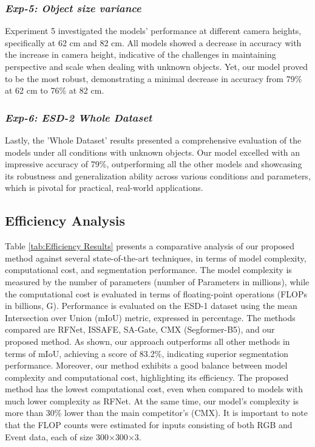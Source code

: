 \documentclass[lettersize,journal]{IEEEtran}
\begin{document}
\subsubsection{\textbf{\textit{Exp-5: Object size variance}}} 
\label{subsubsection : size variance results}

Experiment 5 investigated the models' performance at different camera heights, specifically at 62 cm and 82 cm. All models showed a decrease in accuracy with the increase in camera height, indicative of the challenges in maintaining perspective and scale when dealing with unknown objects. Yet, our model proved to be the most robust, demonstrating a minimal decrease in accuracy from 79\% at 62 cm to 76\% at 82 cm.



\subsubsection{\textbf{\textit{Exp-6: ESD-2 Whole Dataset}}} 
\label{subsubsection : Whole Dataset}


Lastly, the 'Whole Dataset' results presented a comprehensive evaluation of the models under all conditions with unknown objects. Our model excelled with an impressive accuracy of 79\%, outperforming all the other models and showcasing its robustness and generalization ability across various conditions and parameters, which is pivotal for practical, real-world applications.











\subsection{\textbf{Efficiency Analysis}}


Table \ref{tab:Efficiency Results} presents a comparative analysis of our proposed method against several state-of-the-art techniques, in terms of model complexity, computational cost, and segmentation performance. The model complexity is measured by the number of parameters  (number of Parameters in millions), while the computational cost is evaluated in terms of floating-point operations (FLOPs in billions, G). Performance is evaluated on the ESD-1 dataset using the mean Intersection over Union (mIoU) metric, expressed in percentage. The methods compared are RFNet, ISSAFE, SA-Gate, CMX (Segformer-B5), and our proposed method. As shown, our approach outperforms all other methods in terms of mIoU, achieving a score of 83.2\%, indicating superior segmentation performance. Moreover, our method exhibits a good balance between model complexity and computational cost, highlighting its efficiency. The proposed method has the lowest computational cost, even when compared to models with much lower complexity as RFNet. At the same time, our model's complexity is more than 30\% lower than the main competitor's (CMX). It is important to note that the FLOP counts were estimated for inputs consisting of both RGB and Event data, each of size 300$\times$300$\times$3.
\end{document}
